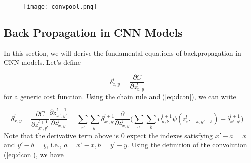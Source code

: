 \documentclass[12pt]{article}
\begin{document}
\begin{figure}[H]
 \label{fig:convp}
  \centering
  \texttt{[image: convpool.png]}
\end{figure}

\subsection{Back Propagation in CNN Models}

In this section, we will derive the fundamental equations of backpropagation in CNN models. Let's define 

\begin{equation}
\label{eq:cnnE1}
\delta_{x,y}^{l} = \dfrac{\partial C}{\partial z_{x,y}^{l}} 
\end{equation} 
for a generic cost function. Using the chain rule and (\ref{eq:dcon}), we can write 

\begin{equation}
\delta_{x,y}^{l} = \dfrac{\partial C}{\partial z_{x',y'}^{l+1}} \dfrac{\partial z_{x',y'}^{l+1}}{\partial z_{x,y}^{l}}
=
\sum\limits_{x'} \sum\limits_{y'} \delta_{x',y'}^{l+1} \dfrac{\partial }{\partial z_{x,y}^{l}} 
\Big( \sum\limits_{a} \sum\limits_{b} w_{a,b}^{l+1}\psi(z_{x'-a,y'-b}^{l})+b_{x',y'}^{l+1} \Big)
\end{equation} 
Note that the derivative term above is 0 expect the indexes satisfying $x'-a=x$ and $y'-b=y$, i.e.,  $a = x'-x, b = y'-y $. Using the definition of the convolution (\ref{eq:dcon}), we have
\end{document}
